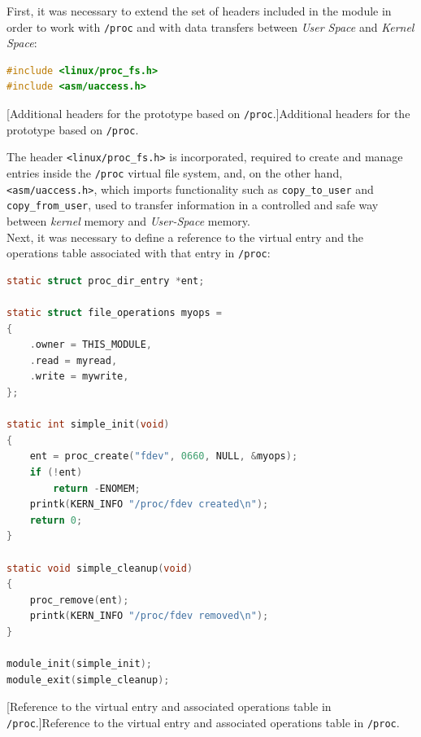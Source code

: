 First, it was necessary to extend the set of headers included in the module in order to work with \texttt{/proc} and with data transfers between \textit{User Space} and \textit{Kernel Space}:

\begin{lstlisting}[language=C]
#include <linux/proc_fs.h>
#include <asm/uaccess.h>
\end{lstlisting}
\captionsetup{type=code,justification=centering,singlelinecheck=false}
[Additional headers for the prototype based on \texttt{/proc}.]{Additional headers for the prototype based on \texttt{/proc}.}
\label{cod:proc_headers}
\vspace{\baselineskip}

The header \verb|<linux/proc_fs.h>| is incorporated, required to create and manage entries inside the \texttt{/proc} virtual file system, and, on the other hand, \verb|<asm/uaccess.h>|, which imports functionality such as \verb|copy_to_user| and \verb|copy_from_user|, used to transfer information in a controlled and safe way between \textit{kernel} memory and \textit{User-Space} memory.\\

Next, it was necessary to define a reference to the virtual entry and the operations table associated with that entry in \texttt{/proc}:\\

\begin{lstlisting}[language=C]
static struct proc_dir_entry *ent;

static struct file_operations myops =
{
    .owner = THIS_MODULE,
    .read = myread,
    .write = mywrite,
};

static int simple_init(void)
{
    ent = proc_create("fdev", 0660, NULL, &myops);
    if (!ent)
        return -ENOMEM;
    printk(KERN_INFO "/proc/fdev created\n");
    return 0;
}

static void simple_cleanup(void)
{
    proc_remove(ent);
    printk(KERN_INFO "/proc/fdev removed\n");
}

module_init(simple_init);
module_exit(simple_cleanup);
\end{lstlisting}
\captionsetup{type=code,justification=centering,singlelinecheck=false}
[Reference to the virtual entry and associated operations table in \texttt{/proc}.]{Reference to the virtual entry and associated operations table in \texttt{/proc}.}
\label{cod:proc_entry_ops}
\vspace{\baselineskip}

